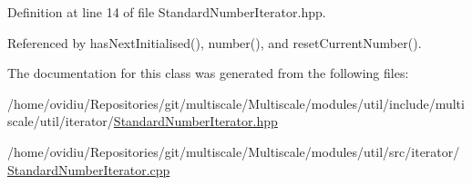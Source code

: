 Definition at line 14 of file Standard\-Number\-Iterator.\-hpp.



Referenced by has\-Next\-Initialised(), number(), and reset\-Current\-Number().



The documentation for this class was generated from the following files\-:\begin{DoxyCompactItemize}
\item 
/home/ovidiu/\-Repositories/git/multiscale/\-Multiscale/modules/util/include/multiscale/util/iterator/\hyperlink{StandardNumberIterator_8hpp}{Standard\-Number\-Iterator.\-hpp}\item 
/home/ovidiu/\-Repositories/git/multiscale/\-Multiscale/modules/util/src/iterator/\hyperlink{StandardNumberIterator_8cpp}{Standard\-Number\-Iterator.\-cpp}\end{DoxyCompactItemize}
